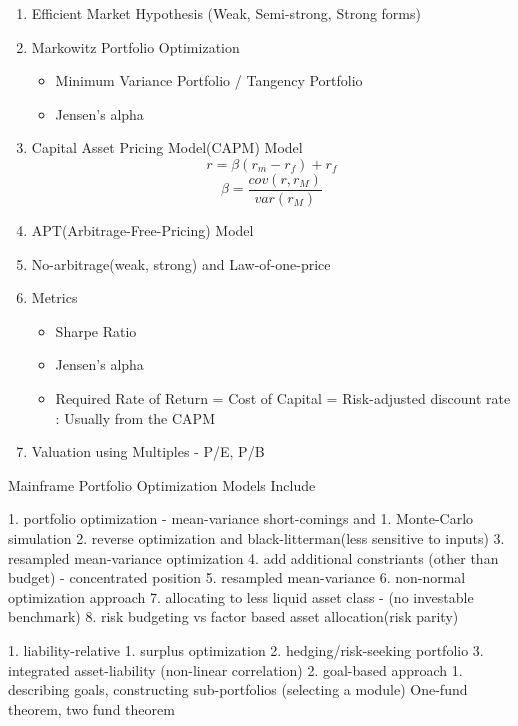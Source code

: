 \documentclass[11pt, openany]{book}              %
\begin{document}
\begin{enumerate}
 \item Efficient Market Hypothesis (Weak, Semi-strong, Strong forms)
 \item Markowitz Portfolio Optimization
 \begin{itemize}
    \item Minimum Variance Portfolio / Tangency Portfolio 
    \item Jensen's alpha
  \end{itemize}

  \item Capital Asset Pricing Model(CAPM) Model \\
        $$ r = \beta(r_m - r_f) + r_f $$
 		$$\beta = \frac{cov(r,r_M)}{var(r_M)}$$
  \item APT(Arbitrage-Free-Pricing) Model 
 \item No-arbitrage(weak, strong) and Law-of-one-price
 \item Metrics
  \begin{itemize}
    \item Sharpe Ratio
    \item Jensen's alpha
    
        \item Required Rate of Return = Cost of Capital = Risk-adjusted discount rate : Usually from the CAPM
   \end{itemize}
 \item Valuation using Multiples - P/E, P/B 
 \end{enumerate}




Mainframe Portfolio Optimization Models Include

    1. portfolio optimization - mean-variance short-comings and 
        1. Monte-Carlo simulation
        2. reverse optimization and black-litterman(less sensitive to inputs)
        3. resampled mean-variance optimization
        4. add additional constriants (other than budget) - concentrated position
        5. resampled mean-variance
        6. non-normal optimization approach
        7. allocating to less liquid asset class - (no investable benchmark)
        8. risk budgeting vs factor based asset allocation(risk parity)


    1. liability-relative
        1. surplus optimization
        2. hedging/risk-seeking portfolio
        3. integrated asset-liability (non-linear correlation)
    2. goal-based approach
        1. describing goals, constructing sub-portfolios (selecting a module)
  One-fund theorem, two fund theorem 
\end{document}
